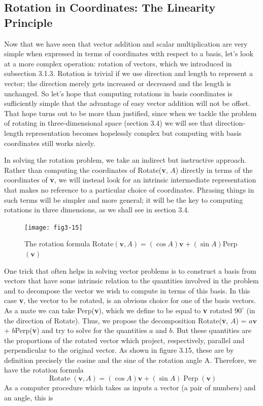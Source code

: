 \documentclass{book}
\begin{document}
\subsection{Rotation in Coordinates: The Linearity Principle}

Now that we have seen that vector addition and scalar multiplication
are very simple when expressed in terms of coordinates with respect to a
basis, let's look at a more complex operation: rotation of vectors, which
we introduced in subsection 3.1.3. Rotation is trivial if we use direction
and length to represent a vector; the direction merely gets increased or
decreased and the length is unchanged. So let's hope that computing
rotations in basis coordinates is sufliciently simple that the advantage
of easy vector addition will not be offset. That hope turns out to be
more than justified, since when we tackle the problem of rotating in
three-dimensional space (section 3.4) we will see that direction-length
representation becomes hopelessly complex but computing with basis
coordinates still works nicely.

In solving the rotation problem, we take an indirect but instructive approach. Rather than computing the coordinates of Rotate(\textbf{v}, $A$) directly
in terms of the coordinates of \textbf{v}, we will instead look for an intrinsic intermediate representation that makes no reference to a particular choice
of coordinates. Phrasing things in such terms will be simpler and more
general; it will be the key to computing rotations in three dimensions,
as we shall see in section 3.4.

\begin{figure}
\begin{center}
\texttt{[image: fig3-15]}
\caption{The rotation formula Rotate$(\mathbf{v}, A) = (\cos A)\mathbf{v} + (\sin A)$Perp$(\mathbf{v})$}
\end{center}
\end{figure}

One trick that often helps in solving vector problems is to construct
a basis from vectors that have some intrinsic relation to the quantities
involved in the problem and to decompose the vector we wish to compute
in terms of this basis. In this case \textbf{v}, the vector to be rotated, is
an obvious choice for one of the basis vectors. As a mate we can take
Perp(\textbf{v}), which we define to be equal to \textbf{v} rotated $90^{\circ}$ (in the direction
of Rotate). Thus, we propose the decomposition
Rotate(\textbf{v}, $A$) = $a\mathbf{v}$ + $b$Perp(\textbf{v})
and try to solve for the quantities $a$ and $b$. But these quantities are the
proportions of the rotated vector which project, respectively, parallel
and perpendicular to the original vector. As shown in figure 3.15, these
are by definition precisely the cosine and the sine of the rotation angle
A. Therefore, we have the rotation formula
$$\operatorname{Rotate}(\mathbf{v}, A) = (\cos A)\mathbf{v} + (\sin A)\operatorname{Perp}(\mathbf{v})$$ As a computer procedure which takes as inputs a vector (a pair of
numbers) and an angle, this is
\end{document}
